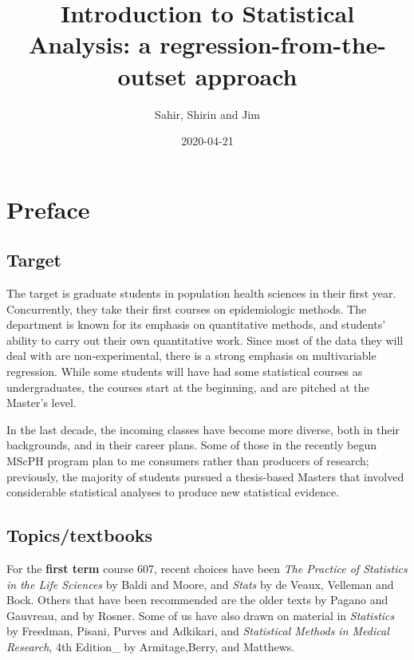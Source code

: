 \documentclass[]{book}
\title{Introduction to Statistical Analysis: a regression-from-the-outset approach}
\author{Sahir, Shirin and Jim}
\date{2020-04-21}
\begin{document}
\maketitle

{
\setcounter{tocdepth}{1}
\tableofcontents
}
\hypertarget{preface}{%
\chapter*{Preface}\label{preface}}

\hypertarget{target}{%
\section{Target}\label{target}}

The target is graduate students in population health sciences in their first year. Concurrently, they take their first courses on epidemiologic methods. The department is known for its emphasis on quantitative methods, and students' ability to carry out their own quantitative work. Since most of the data they will deal with are non-experimental, there is a strong emphasis on multivariable regression. While some students will have had some statistical courses as undergraduates, the courses start at the beginning, and are pitched at the Master's level.

In the last decade, the incoming classes have become more diverse, both in their backgrounds, and in their career plans. Some of those in the recently begun MScPH program plan to me consumers rather than producers of research; previously, the majority of students pursued a thesis-based Masters that involved considerable statistical analyses to produce new statistical evidence.

\hypertarget{topicstextbooks}{%
\section{Topics/textbooks}\label{topicstextbooks}}

For the \textbf{first term} course 607, recent choices have been \emph{The Practice of Statistics in the Life Sciences} by Baldi and Moore, and \emph{Stats} by de Veaux, Velleman and Bock. Others that have been recommended are the older texts by Pagano and Gauvreau, and by Rosner. Some of us have also drawn on material in \emph{Statistics} by Freedman, Pisani, Purves and Adkikari, and
\emph{Statistical Methods in Medical Research}, 4th Edition\_ by
Armitage,Berry, and Matthews.
\end{document}
